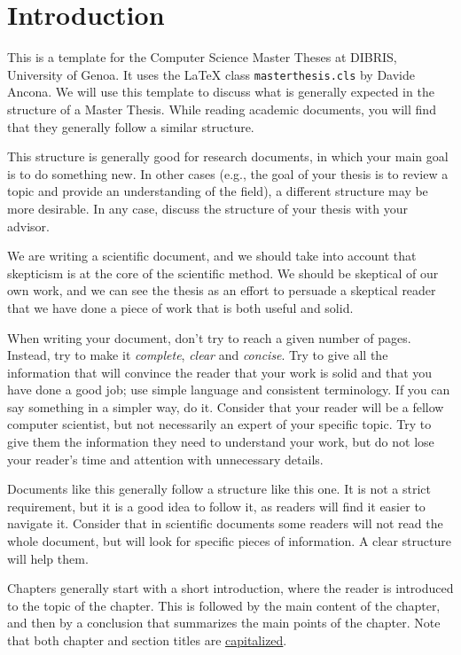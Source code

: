 \chapter{Introduction}
\label{sec:introduction}

This is a template for the Computer Science Master Theses at DIBRIS,
University of Genoa. It uses the \xspace{\LaTeX} class \texttt{masterthesis.cls} by
Davide Ancona. We will use this template to discuss what is generally expected in the
structure of a Master Thesis. While reading academic documents, you will find that
they generally follow a similar structure.

This structure is generally good for research documents, in which your main goal is to do
something new. In other cases (e.g., the goal of your thesis is to review a topic and provide
an understanding of the field), a different structure may be more desirable. In any case,
discuss the structure of your thesis with your advisor.

We are writing a scientific document, and we should take into account that skepticism
is at the core of the scientific method. We should be skeptical of our own work, and
we can see the thesis as an effort to persuade a skeptical reader that we have done
a piece of work that is both useful and solid.

When writing your document, don't try to reach a given number of pages. Instead, try to make it
\emph{complete}, \emph{clear} and \emph{concise}. Try to give all the information that will
convince the reader that your work is solid and that you have done a good job; use simple
language and consistent terminology. If you can say something in a simpler way, do it.
Consider that your reader will be a fellow computer scientist, but not necessarily an expert
of your specific topic. Try to give them the information they need to understand your work, but
do not lose your reader's time and attention with unnecessary details.

Documents like this generally follow a structure like this one. It is not a strict
requirement, but it is a good idea to follow it, as readers will find it easier to navigate it.
Consider that in scientific documents some readers will not read the whole document,
but will look for specific pieces of information. A clear structure will help them.

Chapters generally start with a short introduction, where the reader is introduced to the topic
of the chapter. This is followed by the main content of the chapter, and then by a conclusion
that summarizes the main points of the chapter. Note that both chapter and section titles are
\href{https://www.grammarly.com/blog/capitalization-in-the-titles/}{capitalized}.

